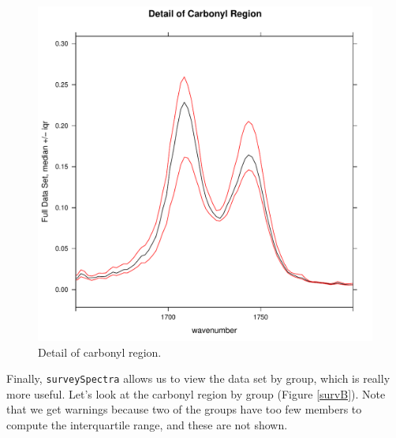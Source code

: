 \documentclass[letter,10pt,twocolumn,twoside,printwatermark=false]{pinp}
\begin{document}
\begin{figure}

{\centering \includegraphics[width=\linewidth,height=\linewidth]{ChemoSpec2_files/figure-latex/Chunk14a-1} 

}

\caption{\label{survA}Detail of carbonyl region.}\label{fig:Chunk14a}
\end{figure}

Finally, \texttt{surveySpectra} allows us to view the data set by group,
which is really more useful. Let's look at the carbonyl region by group
(Figure \ref{survB}). Note that we get warnings because two of the
groups have too few members to compute the interquartile range, and
these are not shown.

\begin{Shaded}
\begin{Highlighting}[]
   \NormalTok{,}
   \NormalTok{,}
   \NormalTok{,}
   \NormalTok{(}\NormalTok{, }\NormalTok{))}
\end{Highlighting}
\end{Shaded}
\end{document}

